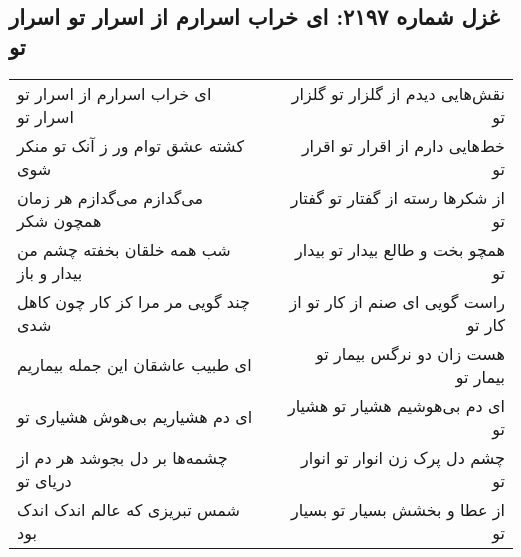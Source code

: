 \begin{center}
\section*{غزل شماره ۲۱۹۷: ای خراب اسرارم از اسرار تو اسرار تو}
\label{sec:2197}
\begin{longtable}{l p{0.5cm} r}
ای خراب اسرارم از اسرار تو اسرار تو
&&
نقش‌هایی دیدم از گلزار تو گلزار تو
\\
کشته عشق توام ور ز آنک تو منکر شوی
&&
خط‌هایی دارم از اقرار تو اقرار تو
\\
می‌گدازم می‌گدازم هر زمان همچون شکر
&&
از شکرها رسته از گفتار تو گفتار تو
\\
شب همه خلقان بخفته چشم من بیدار و باز
&&
همچو بخت و طالع بیدار تو بیدار تو
\\
چند گویی مر مرا کز کار چون کاهل شدی
&&
راست گویی ای صنم از کار تو از کار تو
\\
ای طبیب عاشقان این جمله بیماریم
&&
هست زان دو نرگس بیمار تو بیمار تو
\\
ای دم هشیاریم بی‌هوش هشیاری تو
&&
ای دم بی‌هوشیم هشیار تو هشیار تو
\\
چشمه‌ها بر دل بجوشد هر دم از دریای تو
&&
چشم دل پرک زن انوار تو انوار تو
\\
شمس تبریزی که عالم اندک اندک بود
&&
از عطا و بخشش بسیار تو بسیار تو
\\
\end{longtable}
\end{center}
